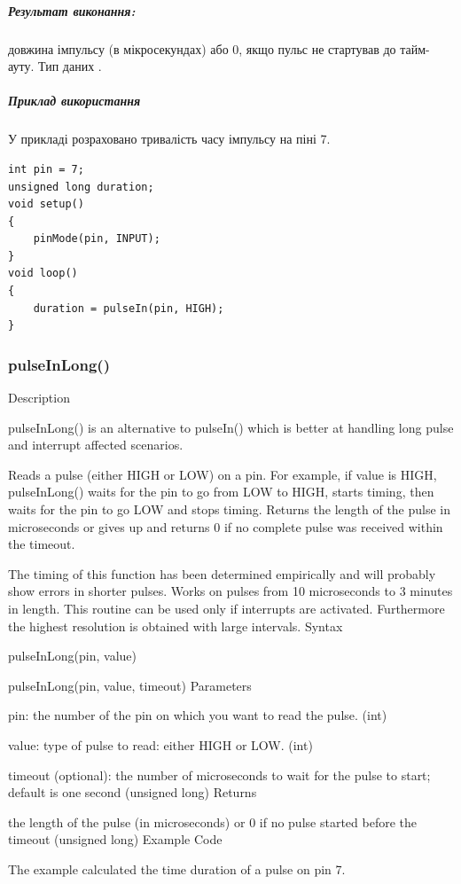 \documentclass[12pt,a4paper]{report}  %
\begin{document}
\subparagraph{Результат виконання:} довжина імпульсу (в мікросекундах) або 0, якщо пульс не стартував до тайм-ауту. Тип даних .

\subparagraph{Приклад використання}
У прикладі розраховано тривалість часу імпульсу на піні 7.

\begin{lstlisting}[label=digitalwrite,caption=pulseIn]
int pin = 7;
unsigned long duration;
void setup()
{
	pinMode(pin, INPUT);
}
void loop()
{
	duration = pulseIn(pin, HIGH);
}
\end{lstlisting}

\subsubsection{pulseInLong()}\label{pulseInLong}


Description

pulseInLong() is an alternative to pulseIn() which is better at handling long pulse and interrupt affected scenarios.

Reads a pulse (either HIGH or LOW) on a pin. For example, if value is HIGH, pulseInLong() waits for the pin to go from LOW to HIGH, starts timing, then waits for the pin to go LOW and stops timing. Returns the length of the pulse in microseconds or gives up and returns 0 if no complete pulse was received within the timeout.

The timing of this function has been determined empirically and will probably show errors in shorter pulses. Works on pulses from 10 microseconds to 3 minutes in length. This routine can be used only if interrupts are activated. Furthermore the highest resolution is obtained with large intervals.
Syntax

pulseInLong(pin, value)

pulseInLong(pin, value, timeout)
Parameters

pin: the number of the pin on which you want to read the pulse. (int)

value: type of pulse to read: either HIGH or LOW. (int)

timeout (optional): the number of microseconds to wait for the pulse to start; default is one second (unsigned long)
Returns

the length of the pulse (in microseconds) or 0 if no pulse started before the timeout (unsigned long)
Example Code

The example calculated the time duration of a pulse on pin 7.
\end{document}
